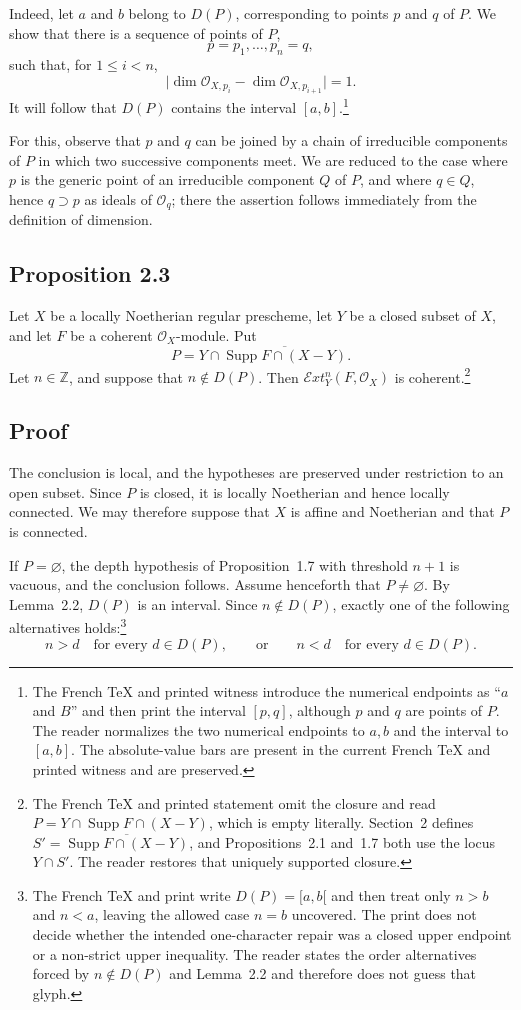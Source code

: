 \documentclass[11pt,a4paper]{article}
\newcommand{\OX}{\mathcal O_X}
\newcommand{\Oo}{\mathcal O}
\newcommand{\SheafExt}{\mathcal E\!xt}
\newcommand{\Supp}{\operatorname{Supp}}
\begin{document}
Indeed, let $a$ and $b$ belong to $D(P)$, corresponding to points $p$ and $q$
of $P$. We show that there is a sequence of points of $P$,
\[
  p=p_1,\ldots,p_n=q,
\]
such that, for $1\leq i<n$,
\[
  \lvert\dim\Oo_{X,p_i}-\dim\Oo_{X,p_{i+1}}\rvert=1.
\]
It will follow that $D(P)$ contains the interval $[a,b]$.\footnote{The French
TeX and printed witness introduce the numerical endpoints as ``$a$ and $B$''
and then print the interval $[p,q]$, although $p$ and $q$ are points of $P$.
The reader normalizes the two numerical endpoints to $a,b$ and the interval to
$[a,b]$. The absolute-value bars are present in the current French TeX and
printed witness and are preserved.}

For this, observe that $p$ and $q$ can be joined by a chain of irreducible
components of $P$ in which two successive components meet. We are reduced to
the case where $p$ is the generic point of an irreducible component $Q$ of
$P$, and where $q\in Q$, hence $q\supset p$ as ideals of $\Oo_q$; there the
assertion follows immediately from the definition of dimension.

\clearpage
\subsection*{Proposition 2.3}

Let $X$ be a locally Noetherian regular prescheme, let $Y$ be a closed subset
of $X$, and let $F$ be a coherent $\OX$-module. Put
\[
  P=Y\cap\overline{\Supp F\cap(X-Y)}.
\]
Let $n\in\mathbb Z$, and suppose that $n\notin D(P)$. Then
$\SheafExt_Y^n(F,\OX)$ is coherent.\footnote{The French TeX and printed
statement omit the closure and read
$P=Y\cap\Supp F\cap(X-Y)$, which is empty literally. Section~2 defines
$S'=\overline{\Supp F\cap(X-Y)}$, and Propositions~2.1 and~1.7 both use the
locus $Y\cap S'$. The reader restores that uniquely supported closure.}

\subsection*{Proof}

The conclusion is local, and the hypotheses are preserved under restriction
to an open subset. Since $P$ is closed, it is locally Noetherian and hence
locally connected. We may therefore suppose that $X$ is affine and Noetherian
and that $P$ is connected.

If $P=\varnothing$, the depth hypothesis of Proposition~1.7 with threshold
$n+1$ is vacuous, and the conclusion follows. Assume henceforth that
$P\neq\varnothing$. By Lemma~2.2, $D(P)$ is an interval. Since
$n\notin D(P)$, exactly one of the following alternatives holds:\footnote{The
French TeX and print write $D(P)=[a,b[$ and then treat only $n>b$ and $n<a$,
leaving the allowed case $n=b$ uncovered. The print does not decide whether
the intended one-character repair was a closed upper endpoint or a non-strict
upper inequality. The reader states the order alternatives forced by
$n\notin D(P)$ and Lemma~2.2 and therefore does not guess that glyph.}
\[
  n>d\quad\text{for every }d\in D(P),
  \qquad\text{or}\qquad
  n<d\quad\text{for every }d\in D(P).
\]
\end{document}
